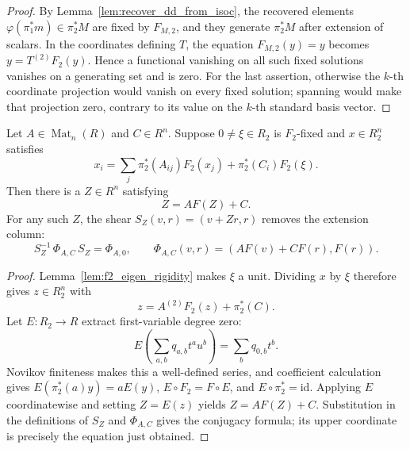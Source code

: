 \begin{proof}
  \leanok
  By Lemma~\ref{lem:recover_dd_from_isoc}, the recovered elements
  $\varphi(\pi_1^\ast m)\in\pi_2^\ast M$ are fixed by $F_{M,2}$, and they generate
  $\pi_2^\ast M$ after extension of scalars.  In the coordinates defining $T$, the
  equation $F_{M,2}(y)=y$ becomes $y=T^{(2)}F_2(y)$.  Hence a functional
  vanishing on all such fixed solutions vanishes on a generating set and is
  zero.  For the last assertion, otherwise the $k$-th coordinate projection
  would vanish on every fixed solution; spanning would make that projection
  zero, contrary to its value on the $k$-th standard basis vector.
\end{proof}

\begin{lemma}
  \label{lem:split_frobenius_extension}
  \leanok
  Let $A\in\operatorname{Mat}_n(R)$ and $C\in R^n$.  Suppose
  $0\ne\xi\in R_2$ is $F_2$-fixed and $x\in R_2^n$ satisfies
  \[
    x_i=\sum_j\pi_2^\ast(A_{ij})F_2(x_j)
      +\pi_2^\ast(C_i)F_2(\xi).
  \]
  Then there is a $Z\in R^n$ satisfying
  \[
    Z=AF(Z)+C.
  \]
  For any such $Z$, the shear $S_Z(v,r)=(v+Zr,r)$ removes the extension
  column:
  \[
    S_Z^{-1}\,\Phi_{A,C}\,S_Z=\Phi_{A,0},
    \qquad
    \Phi_{A,C}(v,r)=(AF(v)+CF(r),F(r)).
  \]
\end{lemma}

\begin{proof}
  \leanok
  Lemma~\ref{lem:f2_eigen_rigidity} makes $\xi$ a unit.  Dividing $x$ by
  $\xi$ therefore gives $z\in R_2^n$ with
  \[
    z=A^{(2)}F_2(z)+\pi_2^\ast(C).
  \]
  Let $E\colon R_2\to R$ extract first-variable degree zero:
  \[
    E\left(\sum_{a,b}q_{a,b}t^a u^b\right)
      =\sum_b q_{0,b}t^b.
  \]
  Novikov finiteness makes this a well-defined series, and coefficient
  calculation gives
  $E(\pi_2^\ast(a)y)=aE(y)$, $E\circ F_2=F\circ E$, and
  $E\circ\pi_2^\ast=\mathrm{id}$.  Applying $E$ coordinatewise and setting
  $Z=E(z)$ yields $Z=AF(Z)+C$.  Substitution in the definitions of $S_Z$ and
  $\Phi_{A,C}$ gives the conjugacy formula; its upper coordinate is precisely
  the equation just obtained.
\end{proof}

